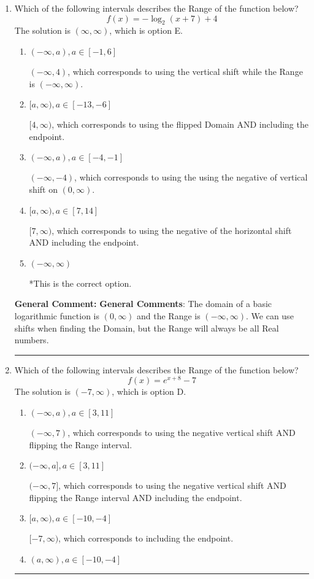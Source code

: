 \documentclass{extbook}[14pt]
\newcommand{\litem}[1]{\item #1

\rule{\textwidth}{0.4pt}}
\begin{document}
\begin{enumerate}\litem{
Which of the following intervals describes the Range of the function below?
\[ f(x) = -\log_2{(x+7)}+4 \]The solution is \( (\infty, \infty) \), which is option E.\begin{enumerate}[label=\Alph*.]
\item \( (-\infty, a), a \in [-1, 6] \)

$(-\infty, 4)$, which corresponds to using the vertical shift while the Range is $(-\infty, \infty)$.
\item \( [a, \infty), a \in [-13, -6] \)

$[4, \infty)$, which corresponds to using the flipped Domain AND including the endpoint.
\item \( (-\infty, a), a \in [-4, -1] \)

$(-\infty, -4)$, which corresponds to using the using the negative of vertical shift on $(0, \infty)$.
\item \( [a, \infty), a \in [7, 14] \)

$[7, \infty)$, which corresponds to using the negative of the horizontal shift AND including the endpoint.
\item \( (-\infty, \infty) \)

*This is the correct option.
\end{enumerate}

\textbf{General Comment:} \textbf{General Comments}: The domain of a basic logarithmic function is $(0, \infty)$ and the Range is $(-\infty, \infty)$. We can use shifts when finding the Domain, but the Range will always be all Real numbers.
}
\litem{
Which of the following intervals describes the Range of the function below?
\[ f(x) = e^{x+8}-7 \]The solution is \( (-7, \infty) \), which is option D.\begin{enumerate}[label=\Alph*.]
\item \( (-\infty, a), a \in [3, 11] \)

$(-\infty, 7)$, which corresponds to using the negative vertical shift AND flipping the Range interval.
\item \( (-\infty, a], a \in [3, 11] \)

$(-\infty, 7]$, which corresponds to using the negative vertical shift AND flipping the Range interval AND including the endpoint.
\item \( [a, \infty), a \in [-10, -4] \)

$[-7, \infty)$, which corresponds to including the endpoint.
\item \( (a, \infty), a \in [-10, -4] \)


\end{enumerate}}
\end{enumerate}
\end{document}

